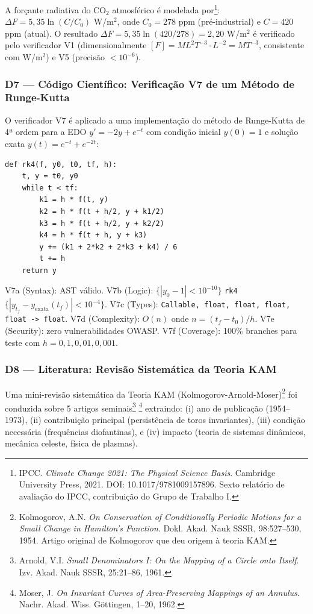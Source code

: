 A forçante radiativa do CO$_2$ atmosférico é modelada por\footnote{IPCC.
\textit{Climate Change 2021: The Physical Science Basis}. Cambridge University
Press, 2021. DOI: 10.1017/9781009157896. Sexto relatório de avaliação do IPCC,
contribuição do Grupo de Trabalho I.}:
$\Delta F = 5,35 \ln(C/C_0)$ W/m$^2$, onde $C_0 = 278$ ppm (pré-industrial)
e $C = 420$ ppm (atual). O resultado $\Delta F = 5,35 \ln(420/278) = 2,20$
W/m$^2$ é verificado pelo verificador V1 (dimensionalmente $[F] = ML^2T^{-3}
\cdot L^{-2} = MT^{-3}$, consistente com W/m$^2$) e V5 (precisão $< 10^{-6}$).

\subsubsection{D7 — Código Científico: Verificação V7 de um Método de Runge-Kutta}

O verificador V7 é aplicado a uma implementação do método de Runge-Kutta de
4ª ordem para a EDO $y' = -2y + e^{-t}$ com condição inicial $y(0) = 1$ e
solução exata $y(t) = e^{-t} + e^{-2t}$:

\begin{verbatim}
def rk4(f, y0, t0, tf, h):
    t, y = t0, y0
    while t < tf:
        k1 = h * f(t, y)
        k2 = h * f(t + h/2, y + k1/2)
        k3 = h * f(t + h/2, y + k2/2)
        k4 = h * f(t + h, y + k3)
        y += (k1 + 2*k2 + 2*k3 + k4) / 6
        t += h
    return y
\end{verbatim}

V7a (Syntax): AST válido. V7b (Logic): $\{|y_0 - 1| < 10^{-10}\}$
\texttt{rk4} $\{|y_{t_f} - y_{\text{exata}}(t_f)| < 10^{-4}\}$. V7c (Types):
\texttt{Callable, float, float, float, float -> float}. V7d (Complexity):
$O(n)$ onde $n = (t_f - t_0)/h$. V7e (Security): zero vulnerabilidades OWASP.
V7f (Coverage): 100\% branches para teste com $h = 0,1, 0,01, 0,001$.

\subsubsection{D8 — Literatura: Revisão Sistemática da Teoria KAM}

Uma mini-revisão sistemática da Teoria KAM (Kolmogorov-Arnold-Moser)\footnote{Kolmogorov, A.N. \textit{On Conservation of Conditionally Periodic Motions
for a Small Change in Hamilton's Function}. Dokl. Akad. Nauk SSSR, 98:527--530,
1954. Artigo original de Kolmogorov que deu origem à teoria KAM.} foi conduzida
sobre 5 artigos seminais\footnote{Arnold, V.I. \textit{Small Denominators I:
On the Mapping of a Circle onto Itself}. Izv. Akad. Nauk SSSR, 25:21--86, 1961.}
\footnote{Moser, J. \textit{On Invariant Curves of Area-Preserving Mappings of
an Annulus}. Nachr. Akad. Wiss. Göttingen, 1--20, 1962.} extraindo: (i) ano
de publicação (1954--1973), (ii) contribuição principal (persistência de toros
invariantes), (iii) condição necessária (frequências diofantinas), e (iv)
impacto (teoria de sistemas dinâmicos, mecânica celeste, física de plasmas).

